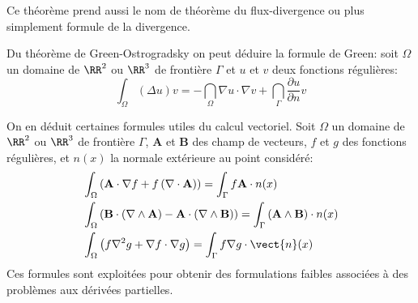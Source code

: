 \medskip
Ce théorème prend aussi le nom de théorème du flux-divergence ou plus simplement formule de la
divergence.

\begin{theoreme}
Du théorème de Green-Ostrogradsky on peut déduire la  formule de Green:
soit $\Omega$ un domaine de $\RR^2$ ou $\RR^3$ de frontière $\Gamma$
et $u$ et $v$ deux fonctions régulières:
\begin{equation}
    \int_\Omega (\Delta u)v = -\dint_\Omega \nabla u\cdot\nabla v + \dint_\Gamma \dfrac{\partial u}{\partial n}v
\end{equation}
\end{theoreme}

\medskip
On en déduit certaines formules utiles du calcul vectoriel.
Soit $\Omega$ un domaine de $\RR^2$ ou $\RR^3$ de frontière $\Gamma$,
${\mathbf{A} }$ et ${\mathbf{B} }$ des champ de vecteurs, $f$ et $g$ des
fonctions régulières, et $n(x)$ la normale extérieure au point considéré:
\begin{align}
    &\int_\Omega \left( {\mathbf{A} }\cdot \nabla f + f \left(\nabla \cdot {\mathbf{A} }\right)\right)=
   \int_\Gamma f {\mathbf{A} }\cdot n(x)\\
&\int_\Omega \left( {\mathbf{B} }\cdot\left(\nabla \wedge {\mathbf{A} }\right) - {\mathbf{A} }\cdot \left(\nabla
\wedge {\mathbf{B} }\right) \right)
= \int_\Gamma \left({\mathbf{A} } \wedge {\mathbf{B} }\right)\cdot n(x)\\
&\int_\Omega \left( f \nabla^{2} g + \nabla f \cdot \nabla g \right)
= \int_\Gamma f \nabla g \cdot \vect{n}(x)
\end{align}
Ces formules sont exploitées pour obtenir des formulations faibles associées à des problèmes aux dérivées partielles. 